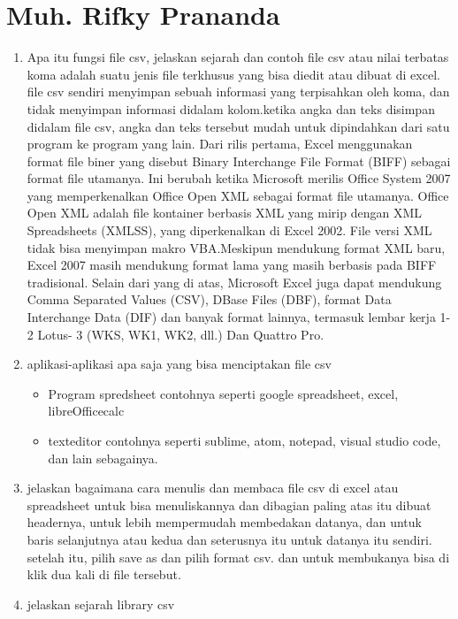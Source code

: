 \section{Muh. Rifky Prananda}
\begin{enumerate}
       \item Apa itu fungsi file csv, jelaskan sejarah dan contoh
       file csv atau nilai terbatas koma adalah suatu jenis file terkhusus yang bisa diedit atau dibuat di excel. file csv sendiri menyimpan sebuah informasi yang terpisahkan oleh koma, dan tidak menyimpan informasi didalam kolom.ketika angka dan teks disimpan didalam file csv, angka dan teks tersebut mudah untuk dipindahkan dari satu program ke program yang lain.
Dari rilis pertama, Excel menggunakan format file biner yang disebut Binary Interchange File Format (BIFF) sebagai format file utamanya. Ini berubah ketika Microsoft merilis Office System 2007 yang memperkenalkan Office Open XML sebagai format file utamanya. Office Open XML adalah file kontainer berbasis XML yang mirip dengan XML Spreadsheets (XMLSS), yang diperkenalkan di Excel 2002. File versi XML tidak bisa menyimpan makro VBA.Meskipun mendukung format XML baru, Excel 2007 masih mendukung format lama yang masih berbasis pada BIFF tradisional. Selain dari yang di atas, Microsoft Excel juga dapat mendukung Comma Separated Values (CSV), DBase Files (DBF), format Data Interchange Data (DIF) dan banyak format lainnya, termasuk lembar kerja 1-2 Lotus- 3 (WKS, WK1, WK2, dll.) Dan Quattro Pro.
        \item aplikasi-aplikasi apa saja yang bisa menciptakan file csv
        \begin{itemize}
               \item Program spredsheet
               contohnya seperti google spreadsheet, excel, libreOfficecalc
               \item texteditor
               contohnya seperti sublime, atom, notepad, visual studio code, dan lain sebagainya.
        \end{itemize}
        \item jelaskan bagaimana cara menulis dan membaca file csv di excel atau spreadsheet
        untuk bisa menuliskannya dan dibagian paling atas itu dibuat headernya, untuk lebih mempermudah membedakan datanya, dan untuk baris selanjutnya atau kedua dan seterusnya itu untuk datanya itu sendiri. setelah itu, pilih save as dan pilih format csv. dan untuk membukanya bisa di klik dua kali di file tersebut.
        \item jelaskan sejarah library csv

\end{enumerate}
